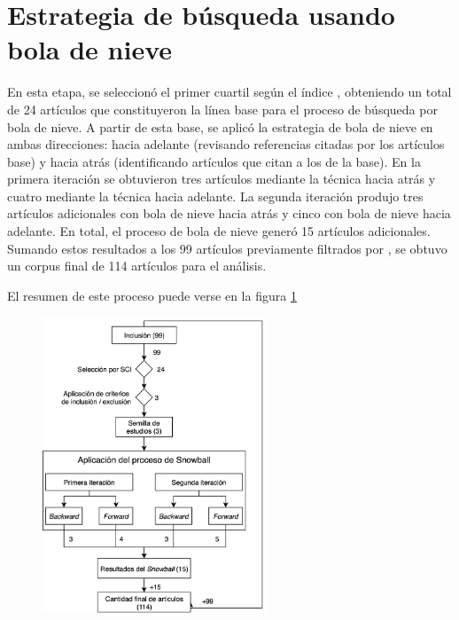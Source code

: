 \section{Estrategia de búsqueda usando bola de nieve}\label{sec:bolaDeNieve}
\noindent

En esta etapa, se seleccionó el primer cuartil según el índice \SCI, obteniendo un total de 24 artículos que constituyeron la línea base para el proceso de búsqueda por bola de nieve. A partir de esta base, se aplicó la estrategia de bola de nieve en ambas direcciones: hacia adelante (revisando referencias citadas por los artículos base) y hacia atrás (identificando artículos que citan a los de la base). En la primera iteración se obtuvieron tres artículos mediante la técnica hacia atrás y cuatro mediante la técnica hacia adelante. La segunda iteración produjo tres artículos adicionales con bola de nieve hacia atrás y cinco con bola de nieve hacia adelante. En total, el proceso de bola de nieve generó 15 artículos adicionales. Sumando estos resultados a los 99 artículos previamente filtrados por \SCI, se obtuvo un corpus final de 114 artículos para el análisis.

El resumen de este proceso puede verse en la figura \ref{fig:resumen-snowball}

\begin{figure}[H]
	\begin{center}
		\includegraphics[width=0.6\textwidth]{tablas-images/sms/resumen-snowball.png}
	\end{center}
	\caption{}\label{fig:resumen-snowball}
\end{figure}


